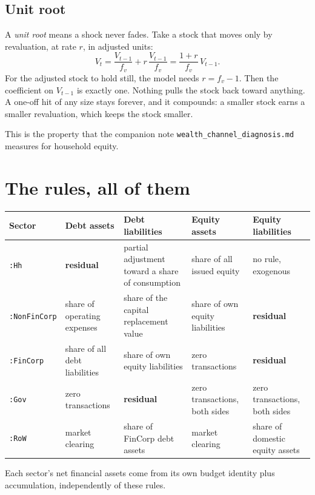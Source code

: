 \documentclass[11pt,a4paper]{article}
\begin{document}
\subsection{Unit root}
\label{sec:unitroot}

A \emph{unit root} means a shock never fades. Take a stock that moves only by
revaluation, at rate $r$, in adjusted units:
\[
  V_t = \frac{V_{t-1}}{f_v} + r\,\frac{V_{t-1}}{f_v}
      = \frac{1+r}{f_v}\,V_{t-1}.
\]
For the adjusted stock to hold still, the model needs $r = f_v - 1$. Then the
coefficient on $V_{t-1}$ is exactly one. Nothing pulls the stock back toward
anything. A one-off hit of any size stays forever, and it compounds: a smaller
stock earns a smaller revaluation, which keeps the stock smaller.

This is the property that the companion note
\texttt{wealth\_channel\_diagnosis.md} measures for household equity.

\section{The rules, all of them}

\begin{table}[h]
\centering
\small
\begin{tabularx}{\textwidth}{@{}lXXXX@{}}
\toprule
Sector & Debt assets & Debt liabilities & Equity assets & Equity liabilities \\
\midrule
\texttt{:Hh}
  & \textbf{residual}
  & partial adjustment toward a share of consumption
  & share of all issued equity
  & no rule, exogenous \\
\addlinespace
\texttt{:NonFinCorp}
  & share of operating expenses
  & share of the capital replacement value
  & share of own equity liabilities
  & \textbf{residual} \\
\addlinespace
\texttt{:FinCorp}
  & share of all debt liabilities
  & share of own equity liabilities
  & zero transactions
  & \textbf{residual} \\
\addlinespace
\texttt{:Gov}
  & zero transactions
  & \textbf{residual}
  & zero transactions, both sides
  & zero transactions, both sides \\
\addlinespace
\texttt{:RoW}
  & market clearing
  & share of FinCorp debt assets
  & market clearing
  & share of domestic equity assets \\
\bottomrule
\end{tabularx}
\end{table}

Each sector's net financial assets come from its own budget identity plus
accumulation, independently of these rules.
\end{document}
